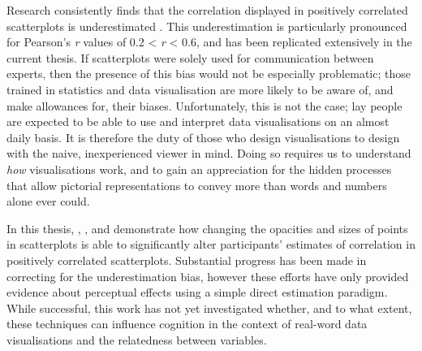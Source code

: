 \documentclass[../main.tex]{subfiles}
\begin{document}
Research consistently finds that the correlation displayed in positively
correlated scatterplots is underestimated
\cite{strahan_1978,bobko_1979, cleveland_1982,
collyer_1990, lane_1985, lauer_1989, meyer_1992, rensink_2017}. This
underestimation is particularly pronounced for Pearson's \emph{r} values
of 0.2 \textless{} \emph{r} \textless{} 0.6, and has been replicated
extensively in the current thesis. If scatterplots were solely used for
communication between experts, then the presence of this bias would not
be especially problematic; those trained in statistics and data
visualisation are more likely to be aware of, and make allowances for,
their biases. Unfortunately, this is not the case; lay people are
expected to be able to use and interpret data visualisations on an
almost daily basis. It is therefore the duty of those who design
visualisations to design with the naive, inexperienced viewer in mind.
Doing so requires us to understand \emph{how} visualisations work, and
to gain an appreciation for the hidden processes that allow pictorial
representations to convey more than words and numbers alone ever could.

In this thesis, ,
, and 
demonstrate how changing the opacities and sizes of points in
scatterplots is able to significantly alter participants' estimates of
correlation in positively correlated scatterplots. Substantial progress
has been made in correcting for the underestimation bias, however these
efforts have only provided evidence about perceptual effects using a
simple direct estimation paradigm. While successful, this work has not
yet investigated whether, and to what extent, these techniques can
influence cognition in the context of real-word data visualisations and
the relatedness between variables.
\end{document}
